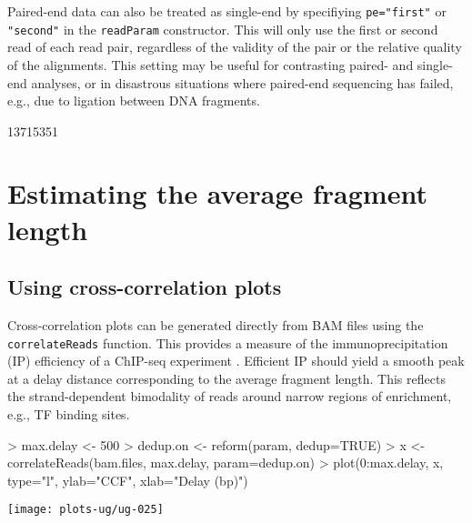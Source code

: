 \documentclass[12pt]{report}
\renewenvironment{Schunk}{\vspace{0pt}}{\vspace{0pt}}
\newcommand{\code}[1]{{\small\texttt{#1}}}
\begin{document}
Paired-end data can also be treated as single-end by specifiying \code{pe="first"} or \code{"second"} in the \code{readParam} constructor. 
This will only use the first or second read of each read pair, regardless of the validity of the pair or the relative quality of the alignments.
This setting may be useful for contrasting paired- and single-end analyses, or in disastrous situations where paired-end sequencing has failed, e.g., due to ligation between DNA fragments.

\begin{Schunk}
\begin{Soutput}
[1] 13715351
\end{Soutput}
\end{Schunk}

\section{Estimating the average fragment length}
\label{sec:ccf}

\subsection{Using cross-correlation plots}
Cross-correlation plots can be generated directly from BAM files using the \code{correlateReads} function. 
This provides a measure of the immunoprecipitation (IP) efficiency of a ChIP-seq experiment \citep{kharchenko2008}. 
Efficient IP should yield a smooth peak at a delay distance corresponding to the average fragment length. 
This reflects the strand-dependent bimodality of reads around narrow regions of enrichment, e.g., TF binding sites. 

\begin{Schunk}
\begin{Sinput}
> max.delay <- 500
> dedup.on <- reform(param, dedup=TRUE)
> x <- correlateReads(bam.files, max.delay, param=dedup.on)
> plot(0:max.delay, x, type="l", ylab="CCF", xlab="Delay (bp)")
\end{Sinput}
\end{Schunk}

\begin{center}
\centering
\texttt{[image: plots-ug/ug-025]}
\end{center}
\end{document}
